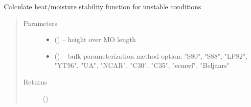 \documentclass[letterpaper,10pt,english]{sphinxmanual}
\begin{document}

\begin{fulllineitems}
\label{\detokenize{index:flux_subs.psi_conv}}
Calculate heat/moisture stability function for unstable conditions
\begin{quote}\begin{description}
\item[{Parameters}] \leavevmode\begin{itemize}
\item {} 
 (\href{https://docs.python.org/3/library/functions.html\#float}{}) -- height over MO length

\item {} 
 (\href{https://docs.python.org/3/library/stdtypes.html\#str}{}) -- bulk parameterization method option: "S80", "S88", "LP82", "YT96", "UA", "NCAR", "C30", "C35", "ecmwf", "Beljaars"

\end{itemize}

\item[{Returns}] \leavevmode
{} (\href{https://docs.python.org/3/library/functions.html\#float}{})

\end{description}\end{quote}

\end{fulllineitems}

\end{document}
